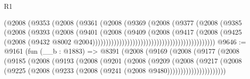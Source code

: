 \begin{lexlean}{R1}
\begin{coremodule}
                                                    (@2008
                                                      (@9353
                                                        (@2008
                                                          (@9361
                                                            (@2008
                                                              (@9369
                                                                (@2008
                                                                  (@9377
                                                                    (@2008
                                                                      (@9385
                                                                        (@2008
                                                                          (@9393
                                                                            (@2008
                                                                              (@9401
                                                                                (@2008
                                                                                  (@9409
                                                                                    (@2008
                                                                                      (@9417
                                                                                        (@2008
                                                                                          (@9425
                                                                                            (@2008
                                                                                              (@9432
                                                                                                @8002
                                                                                                @2004))))))))))))))))))))))))))))))))))))))))))))))
@9646 := @9161
    (fun (__b : @1883) =>
    @8391
      (@2008
        (@9169
          (@2008
            (@9177
              (@2008
                (@9185
                  (@2008
                    (@9193
                      (@2008
                        (@9201
                          (@2008
                            (@9209
                              (@2008
                                (@9217
                                  (@2008
                                    (@9225
                                      (@2008 (@9233 (@2008 (@9241 (@2008 @9480))))))))))))))))))))))

\end{coremodule}
\end{lexlean}
